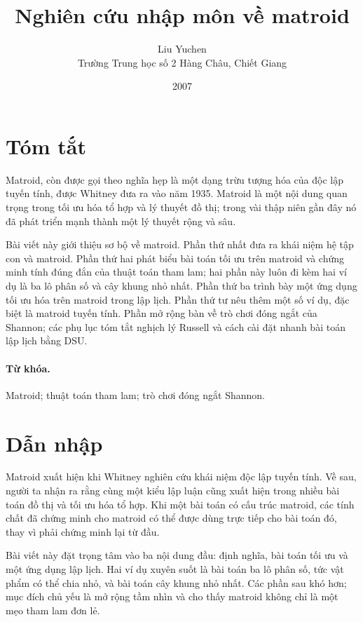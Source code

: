 \documentclass[11pt]{article}
\title{Nghiên cứu nhập môn về matroid}
\author{Liu Yuchen\\Trường Trung học số 2 Hàng Châu, Chiết Giang}
\date{2007}
\begin{document}
\maketitle


\section*{Tóm tắt}

Matroid, còn được gọi theo nghĩa hẹp là một dạng trừu tượng hóa của độc lập
tuyến tính, được Whitney đưa ra vào năm 1935. Matroid là một nội dung quan
trọng trong tối ưu hóa tổ hợp và lý thuyết đồ thị; trong vài thập niên gần
đây nó đã phát triển mạnh thành một lý thuyết rộng và sâu.

Bài viết này giới thiệu sơ bộ về matroid. Phần thứ nhất đưa ra khái niệm hệ
tập con và matroid. Phần thứ hai phát biểu bài toán tối ưu trên matroid và
chứng minh tính đúng đắn của thuật toán tham lam; hai phần này luôn đi kèm
hai ví dụ là ba lô phân số và cây khung nhỏ nhất. Phần thứ ba trình bày một
ứng dụng tối ưu hóa trên matroid trong lập lịch. Phần thứ tư nêu thêm một số
ví dụ, đặc biệt là matroid tuyến tính. Phần mở rộng bàn về trò chơi đóng ngắt
của Shannon; các phụ lục tóm tắt nghịch lý Russell và cách cài đặt nhanh bài
toán lập lịch bằng DSU.

\paragraph{Từ khóa.}
Matroid; thuật toán tham lam; trò chơi đóng ngắt Shannon.

\section*{Dẫn nhập}

Matroid xuất hiện khi Whitney nghiên cứu khái niệm độc lập tuyến tính. Về sau,
người ta nhận ra rằng cùng một kiểu lập luận cũng xuất hiện trong nhiều bài
toán đồ thị và tối ưu hóa tổ hợp. Khi một bài toán có cấu trúc matroid, các
tính chất đã chứng minh cho matroid có thể được dùng trực tiếp cho bài toán
đó, thay vì phải chứng minh lại từ đầu.

Bài viết này đặt trọng tâm vào ba nội dung đầu: định nghĩa, bài toán tối ưu
và một ứng dụng lập lịch. Hai ví dụ xuyên suốt là bài toán ba lô phân số, tức
vật phẩm có thể chia nhỏ, và bài toán cây khung nhỏ nhất. Các phần sau khó
hơn; mục đích chủ yếu là mở rộng tầm nhìn và cho thấy matroid không chỉ là một
mẹo tham lam đơn lẻ.
\end{document}
